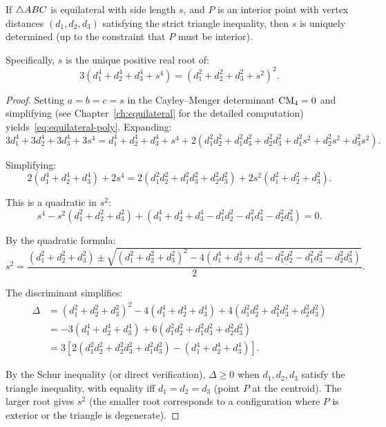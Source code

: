 \begin{theorem}
\label{thm:equilateral-unique}
If $\triangle ABC$ is equilateral with side length $s$, and $P$ is an interior point with vertex distances $(d_1, d_2, d_3)$ satisfying the strict triangle inequality, then $s$ is uniquely determined (up to the constraint that $P$ must be interior).

Specifically, $s$ is the unique positive real root of:
\begin{equation}
\label{eq:equilateral-poly}
3(d_1^4 + d_2^4 + d_3^4 + s^4) = (d_1^2 + d_2^2 + d_3^2 + s^2)^2.
\end{equation}
\end{theorem}

\begin{proof}
Setting $a = b = c = s$ in the Cayley--Menger determinant $\mathrm{CM}_4 = 0$ and simplifying (see Chapter~\ref{ch:equilateral} for the detailed computation) yields~\eqref{eq:equilateral-poly}. Expanding:
\begin{equation}
3d_1^4 + 3d_2^4 + 3d_3^4 + 3s^4 = d_1^4 + d_2^4 + d_3^4 + s^4 + 2(d_1^2 d_2^2 + d_1^2 d_3^2 + d_2^2 d_3^2 + d_1^2 s^2 + d_2^2 s^2 + d_3^2 s^2).
\end{equation}

Simplifying:
\begin{equation}
2(d_1^4 + d_2^4 + d_3^4) + 2s^4 = 2(d_1^2 d_2^2 + d_1^2 d_3^2 + d_2^2 d_3^2) + 2s^2(d_1^2 + d_2^2 + d_3^2).
\end{equation}

This is a quadratic in $s^2$:
\begin{equation}
s^4 - s^2(d_1^2 + d_2^2 + d_3^2) + (d_1^4 + d_2^4 + d_3^4 - d_1^2 d_2^2 - d_1^2 d_3^2 - d_2^2 d_3^2) = 0.
\end{equation}

By the quadratic formula:
\begin{equation}
s^2 = \frac{(d_1^2 + d_2^2 + d_3^2) \pm \sqrt{(d_1^2 + d_2^2 + d_3^2)^2 - 4(d_1^4 + d_2^4 + d_3^4 - d_1^2 d_2^2 - d_1^2 d_3^2 - d_2^2 d_3^2)}}{2}.
\end{equation}

The discriminant simplifies:
\begin{align}
\Delta &= (d_1^2 + d_2^2 + d_3^2)^2 - 4(d_1^4 + d_2^4 + d_3^4) + 4(d_1^2 d_2^2 + d_1^2 d_3^2 + d_2^2 d_3^2) \\
&= -3(d_1^4 + d_2^4 + d_3^4) + 6(d_1^2 d_2^2 + d_1^2 d_3^2 + d_2^2 d_3^2) \\
&= 3\left[2(d_1^2 d_2^2 + d_2^2 d_3^2 + d_1^2 d_3^2) - (d_1^4 + d_2^4 + d_3^4)\right].
\end{align}

By the Schur inequality (or direct verification), $\Delta \geq 0$ when $d_1, d_2, d_3$ satisfy the triangle inequality, with equality iff $d_1 = d_2 = d_3$ (point $P$ at the centroid). The larger root gives $s^2$ (the smaller root corresponds to a configuration where $P$ is exterior or the triangle is degenerate).
\end{proof}

